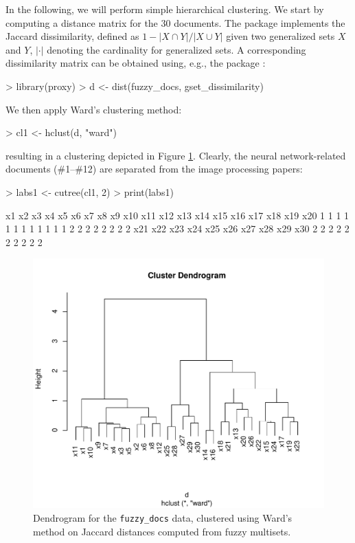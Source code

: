 \documentclass[article]{jss}
\begin{document}
In the following, we will perform simple hierarchical
clustering. We start by computing a distance matrix for the 30
documents. The  package implements the
Jaccard dissimilarity, defined as
$1 - |X \cap Y| / |X \cup Y|$ given two generalized sets $X$ and $Y$, $|\cdot|$
denoting the cardinality for generalized sets.
A corresponding dissimilarity matrix can be obtained using,
e.g., the  package \citep{sets:meyer+buchta:2008}:
\begin{Schunk}
\begin{Sinput}
> library(proxy)
> d <- dist(fuzzy_docs, gset_dissimilarity)
\end{Sinput}
\end{Schunk}
We then apply Ward's clustering method:
\begin{Schunk}
\begin{Sinput}
> cl1 <- hclust(d, "ward")
\end{Sinput}
\end{Schunk}
resulting in a clustering depicted in Figure \ref{fig:cluster1}.
Clearly, the neural network-related documents (\#1--\#12) are separated from
the image processing papers:
\begin{Schunk}
\begin{Sinput}
> labs1 <- cutree(cl1, 2)
> print(labs1)
\end{Sinput}
\begin{Soutput}
 x1  x2  x3  x4  x5  x6  x7  x8  x9 x10 x11 x12 x13 x14 x15 x16 x17 x18 x19 x20 
  1   1   1   1   1   1   1   1   1   1   1   1   2   2   2   2   2   2   2   2 
x21 x22 x23 x24 x25 x26 x27 x28 x29 x30 
  2   2   2   2   2   2   2   2   2   2 
\end{Soutput}
\end{Schunk}

\begin{figure}[h]
\begin{center}
\includegraphics{JSS-clusterplot}
\caption{Dendrogram for the \texttt{fuzzy\_docs} data, clustered using
  Ward's method on Jaccard distances computed from fuzzy multisets.}
\label{fig:cluster1}
\end{center}
\end{figure}
\end{document}
